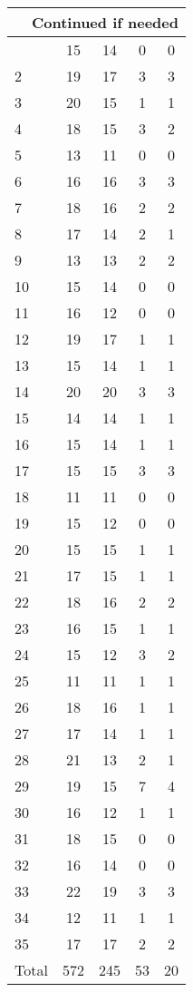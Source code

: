 \begin{center}
\begin{longtable}{l|c|c|c|c}
\hline \multicolumn{5}{|r|}{{Continued if needed}} \\ \hline
\endfoot 
1 & 15 & 14 & 0 & 0\\ \hline
2 & 19 & 17 & 3 & 3\\ \hline
3 & 20 & 15 & 1 & 1\\ \hline
4 & 18 & 15 & 3 & 2\\ \hline
5 & 13 & 11 & 0 & 0\\ \hline
6 & 16 & 16 & 3 & 3\\ \hline
7 & 18 & 16 & 2 & 2\\ \hline
8 & 17 & 14 & 2 & 1\\ \hline
9 & 13 & 13 & 2 & 2\\ \hline
10 & 15 & 14 & 0 & 0\\ \hline
11 & 16 & 12 & 0 & 0\\ \hline
12 & 19 & 17 & 1 & 1\\ \hline
13 & 15 & 14 & 1 & 1\\ \hline
14 & 20 & 20 & 3 & 3\\ \hline
15 & 14 & 14 & 1 & 1\\ \hline
16 & 15 & 14 & 1 & 1\\ \hline
17 & 15 & 15 & 3 & 3\\ \hline
18 & 11 & 11 & 0 & 0\\ \hline
19 & 15 & 12 & 0 & 0\\ \hline
20 & 15 & 15 & 1 & 1\\ \hline
21 & 17 & 15 & 1 & 1\\ \hline
22 & 18 & 16 & 2 & 2\\ \hline
23 & 16 & 15 & 1 & 1\\ \hline
24 & 15 & 12 & 3 & 2\\ \hline
25 & 11 & 11 & 1 & 1\\ \hline
26 & 18 & 16 & 1 & 1\\ \hline
27 & 17 & 14 & 1 & 1\\ \hline
28 & 21 & 13 & 2 & 1\\ \hline
29 & 19 & 15 & 7 & 4\\ \hline
30 & 16 & 12 & 1 & 1\\ \hline
31 & 18 & 15 & 0 & 0\\ \hline
32 & 16 & 14 & 0 & 0\\ \hline
33 & 22 & 19 & 3 & 3\\ \hline
34 & 12 & 11 & 1 & 1\\ \hline
35 & 17 & 17 & 2 & 2\\ \hline
\hline \hline
Total & 572 & 245 & 53 & 20




\end{longtable}
\end{center}

